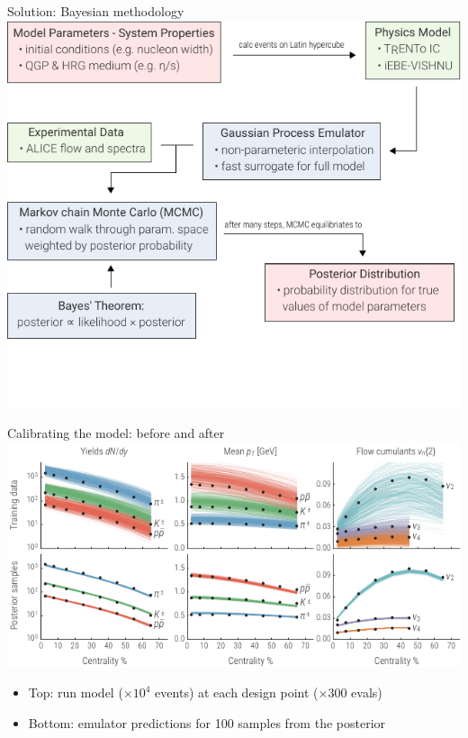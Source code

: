 \documentclass[xcolor=dvipsnames]{beamer}
\begin{document}
\begin{frame}{Solution: Bayesian methodology}
    \vspace{0.7 cm}
    \includegraphics{flowchart}
\end{frame}


\begin{frame}{Calibrating the model: before and after}
    \medskip
    \includegraphics{observables_plot} \\
    \bigskip
    \begin{itemize}
        \small
        \item Top: run model ($\times 10^4$ events) at each design 
              point ($\times300$ evals)
        \vspace{0.2 cm}
        \item Bottom: emulator predictions for 100 samples from 
              the posterior
    \end{itemize}
\end{frame}
\end{document}
